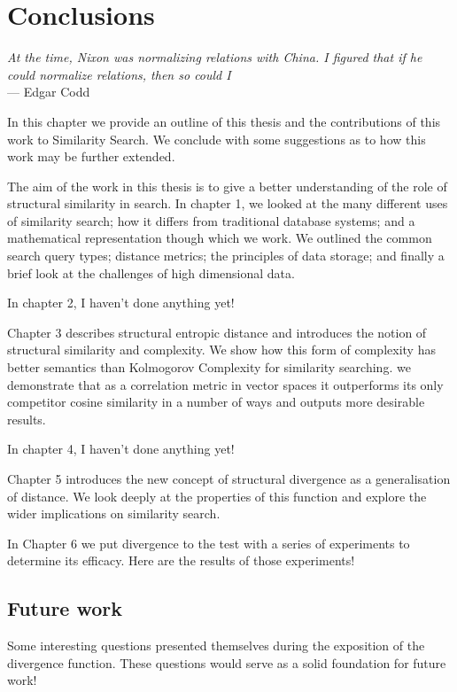 \chapter{Conclusions}\label{ch:conslusions}
\begin{flushleft}{\slshape    
    At the time, Nixon was normalizing relations with China.  
    I figured that if he could normalize relations, then so could I} \\ \medskip
    --- Edgar Codd
\end{flushleft}
In this chapter we provide an outline of this thesis and the contributions of this work to Similarity Search.  We conclude with some suggestions as to how this work may be further extended.  

The aim of the work in this thesis is to give a better understanding of the role of structural similarity in search.  In chapter 1, we looked at the many different uses of similarity search; how it differs from traditional database systems; and a mathematical representation though which we work.  We outlined the common search query types; distance metrics; the principles of data storage; and finally a brief look at the challenges of high dimensional data.

In chapter 2, I haven't done anything yet!

Chapter 3 describes structural entropic distance and introduces the notion of structural similarity and complexity.  We show how this form of complexity has better semantics than Kolmogorov Complexity for similarity searching. we demonstrate that as a correlation metric in vector spaces it outperforms its only competitor cosine similarity in a number of ways and outputs more desirable results. 

In chapter 4, I haven't done anything yet!

Chapter 5 introduces the new concept of structural divergence as a generalisation of distance.  We look deeply at the properties of this function and explore the wider implications on similarity search.

In Chapter 6 we put divergence to the test with a series of experiments to determine its efficacy.  Here are the results of those experiments!

\section{Future work}
Some interesting questions presented themselves during the exposition of the divergence function.  These questions would serve as a solid foundation for future work!